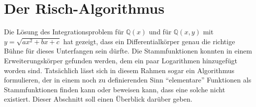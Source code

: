 %
%
%
\section{Der Risch-Algorithmus
\label{buch:integral:section:risch}}
Die Lösung des Integrationsproblem für $\mathbb{Q}(x)$ und für
$\mathbb{Q}(x,y)$ mit $y=\!\sqrt{ax^2+bx+c}$ hat gezeigt, dass
ein Differentialkörper genau die richtige Bühne für dieses Unterfangen
sein dürfte.
Die Stammfunktionen konnten in einem Erweiterungskörper gefunden
werden, dem ein paar Logarithmen hinzugefügt worden sind.
Tatsächlich lässt sich in diesem Rahmen sogar ein Algorithmus
formulieren, der in einem noch zu definierenden Sinn ``elementare''
Funktionen als Stammfunktionen finden kann oder beweisen kann, dass
eine solche nicht existiert.
Dieser Abschnitt soll einen Überblick darüber geben.








